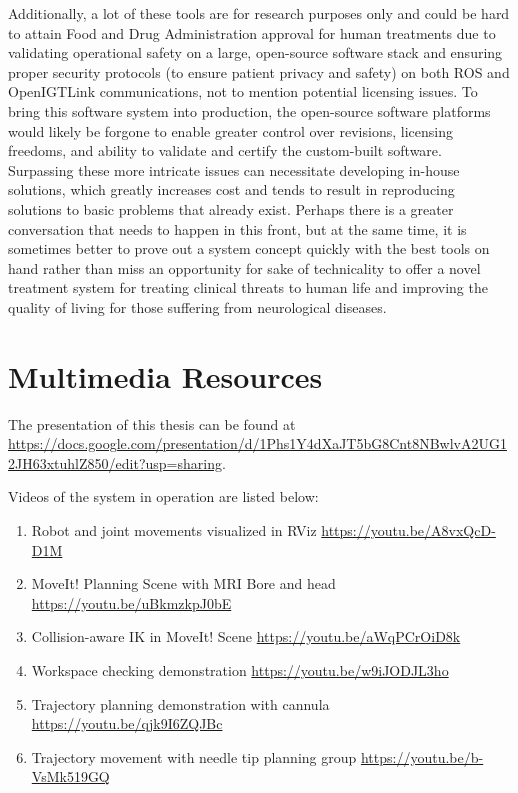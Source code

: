 \documentclass[12pt]{report}
\makeatletter
\renewcommand{\todo}[2][]{%
    \@todo[caption={#2}, #1]{\begin{spacing}{0.5}#2\end{spacing}}%
}
\makeatother
\begin{document}
Additionally, a lot of these tools are for research purposes only and could be hard to attain Food and Drug Administration approval for human treatments due to validating operational safety on a large, open-source software stack and ensuring proper security protocols (to ensure patient privacy and safety) on both ROS and OpenIGTLink communications, not to mention potential licensing issues. To bring this software system into production, the open-source software platforms would likely be forgone to enable greater control over revisions, licensing freedoms, and ability to validate and certify the custom-built software. Surpassing these more intricate issues can necessitate developing in-house solutions, which greatly increases cost and tends to result in reproducing solutions to basic problems that already exist. Perhaps there is a greater conversation that needs to happen in this front, but at the same time, it is sometimes better to prove out a system concept quickly with the best tools on hand rather than miss an opportunity for sake of technicality to offer a novel treatment system for treating clinical threats to human life and improving the quality of living for those suffering from neurological diseases.




\appendix
\chapter{Multimedia Resources}
\label{sec:appendixVideos}
The presentation of this thesis can be found at \url{https://docs.google.com/presentation/d/1Phs1Y4dXaJT5bG8Cnt8NBwlvA2UG12JH63xtuhlZ850/edit?usp=sharing}.

Videos of the system in operation are listed below: \todo{update with newer videos}
\begin{enumerate}
\item Robot and joint movements visualized in RViz \url{https://youtu.be/A8vxQcD-D1M}
\item MoveIt! Planning Scene with MRI Bore and head \url{https://youtu.be/uBkmzkpJ0bE}
\item Collision-aware IK in MoveIt! Scene \url{https://youtu.be/aWqPCrOiD8k}
\item Workspace checking demonstration \url{https://youtu.be/w9iJODJL3ho}
\item Trajectory planning demonstration with cannula \url{https://youtu.be/qjk9I6ZQJBc}
\item Trajectory movement with needle tip planning group \url{https://youtu.be/b-VsMk519GQ}
\end{enumerate}
\end{document}

